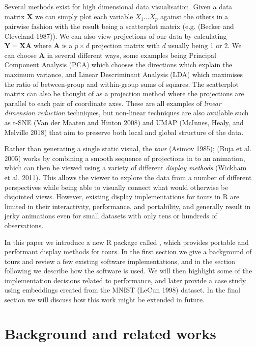 Several methods exist for high dimensional data visualisation. Given a data matrix \(\mathbf X\) we can simply plot each variable \(X_1 \dots X_p\) against the others in a pairwise fashion with the result being a scatterplot matrix (e.g. (Becker and Cleveland 1987)). We can also view projections of our data by calculating \(\mathbf Y = \mathbf X \mathbf A\) where \(\mathbf A\) is a \(p \times d\) projection matrix with \(d\) usually being 1 or 2. We can choose \(\mathbf A\) in several different ways, some examples being Principal Component Analysis (PCA) which chooses the directions which explain the maximum variance, and Linear Descriminant Analysis (LDA) which maximises the ratio of between-group and within-group sums of squares. The scatterplot matrix can also be thought of as a projection method where the projections are parallel to each pair of coordinate axes. These are all examples of \emph{linear dimension reduction} techniques, but non-linear techniques are also available such as t-SNE (Van der Maaten and Hinton 2008) and UMAP (McInnes, Healy, and Melville 2018) that aim to preserve both local and global structure of the data.

Rather than generating a single static visual, the \emph{tour} (Asimov 1985); (Buja et al. 2005) works by combining a smooth sequence of projections in to an animation, which can then be viewed using a variety of different \emph{display methods} (Wickham et al. 2011). This allows the viewer to explore the data from a number of different perspectives while being able to visually connect what would otherwise be disjointed views. However, existing display implementations for tours in R are limited in their interactivity, performance, and portability, and generally result in jerky animations even for small datasets with only tens or hundreds of observations.

In this paper we introduce a new R package called , which provides portable and performant display methods for tours. In the first section we give a background of tours and review a few existing software implementations, and in the section following we describe how the software is used. We will then highlight some of the implementation decisions related to performance, and later provide a case study using embeddings created from the MNIST (LeCun 1998) dataset. In the final section we will discuss how this work might be extended in future.

\hypertarget{background-and-related-works}{%
\section{Background and related works}\label{background-and-related-works}}

